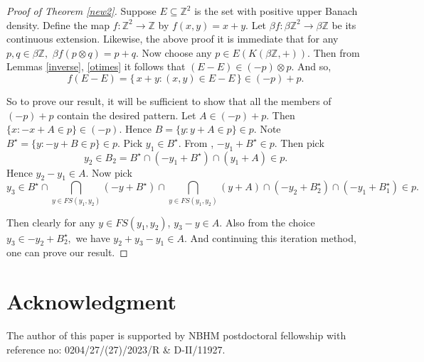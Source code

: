 \documentclass{article}
\theoremstyle{Theorem}
\theoremstyle{definition}
\newcommand{\Z}{\mathbb{Z}}
\begin{document}
\begin{proof}[Proof of Theorem \ref{new2}]
 Suppose $E\subseteq \Z^2$ is the set with positive upper Banach density. Define the map $f:\Z^2\to \Z$ by $f(x,y)=x+y.$ Let $\beta f:\beta \Z^2\to \beta \Z$ be its continuous extension. Likewise, the above proof it is immediate that for any $p,q\in \beta \Z,$ $\beta f(p\otimes q)=p+q.$ Now choose any $p\in  E(K(\beta \Z,+)).$ Then from Lemmas \ref{inverse}, \ref{otimes} it follows that $(E-E)\in (-p)\otimes p.$ And so, 
 \[
 f(E-E)=\{\, x+y : (x,y) \in E - E \,\}\in (-p)+p.
 \]

So to prove our result, it will be sufficient to show that all the members of $(-p)+p$ contain the desired pattern.
Let $A\in (-p)+p.$ Then $\{x:-x+A\in p\}\in (-p).$ Hence $B=\{y: y+A\in p\}\in p.$ Note $B^\star=\{y:-y+B\in p\}\in p.$ Pick $y_1\in B^\star.$ From \cite[Lemma 4.14]{book}, $-y_1+B^\star \in p.$
Then pick $$y_2\in B_2=B^\star \cap (-y_1+B^\star)\cap (y_1+A)\in p.$$ Hence $y_2-y_1\in A.$ Now pick $$y_3\in B^\star \cap \bigcap_{y\in FS({y_1,y_2})}(-y+B^\star)\cap \bigcap_{y\in FS({y_1,y_2})}(y+A)\cap (-y_2+B_2^\star)\cap (-y_1+B_1^\star)\in p.$$

Then clearly for any $y\in FS({y_1,y_2})$, $y_3-y\in A.$ Also from the choice $y_3\in -y_2+B_2^\star,$ we have $y_2+y_3-y_1\in A.$ And continuing this iteration method, one can prove our result.

\end{proof}



 \section*{Acknowledgment} The author of this paper is supported by NBHM postdoctoral fellowship with reference no: 0204/27/(27)/2023/R \& D-II/11927.
\end{document}
